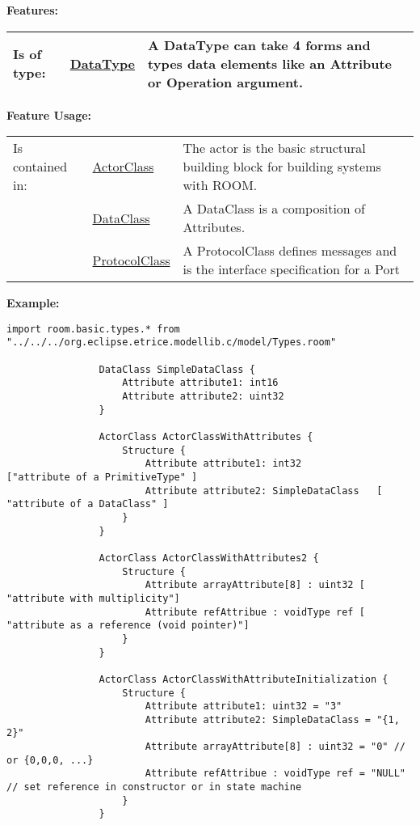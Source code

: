 		\begingroup
		\textbf{Features:}
		\renewcommand{\arraystretch}{1.8} %
		\begin{longtable}{l|l p{}}
			\hline
		Is of type: & \tabitem \hyperlink{ref:DataType}{DataType}  & A DataType can take 4 forms and types data elements like an Attribute or Operation argument.\\
		\hline
		\end{longtable}
		\endgroup
		
		\begingroup
		\textbf{Feature Usage:}
		\renewcommand{\arraystretch}{1.8} %
		\begin{longtable}{l|l p{}}
			\hline
		Is contained in: & \tabitem \hyperlink{ref:ActorClass}{ActorClass}  & The actor is the basic structural building block for building systems with ROOM.\\
		& \tabitem \hyperlink{ref:DataClass}{DataClass}  & A DataClass is a composition of Attributes. \\
		& \tabitem \hyperlink{ref:ProtocolClass}{ProtocolClass}  & A ProtocolClass defines messages and is the interface specification for a Port \\
		\hline
		\end{longtable}
		\endgroup
		
		\textbf{Example:}
		
				\begin{lstlisting}[language=ROOM]
				import room.basic.types.* from "../../../org.eclipse.etrice.modellib.c/model/Types.room"
				
				DataClass SimpleDataClass {
					Attribute attribute1: int16
					Attribute attribute2: uint32
				}
			
				ActorClass ActorClassWithAttributes {
					Structure {
						Attribute attribute1: int32 			["attribute of a PrimitiveType" ]
						Attribute attribute2: SimpleDataClass 	[ "attribute of a DataClass" ]
					}
				}
			
				ActorClass ActorClassWithAttributes2 {
					Structure {
						Attribute arrayAttribute[8] : uint32 [ "attribute with multiplicity"]
						Attribute refAttribue : voidType ref [ "attribute as a reference (void pointer)"]
					}
				}
			
				ActorClass ActorClassWithAttributeInitialization {
					Structure {
						Attribute attribute1: uint32 = "3"
						Attribute attribute2: SimpleDataClass = "{1, 2}"
						Attribute arrayAttribute[8] : uint32 = "0" // or {0,0,0, ...}
						Attribute refAttribue : voidType ref = "NULL" // set reference in constructor or in state machine
					}
				}
				\end{lstlisting}
	
